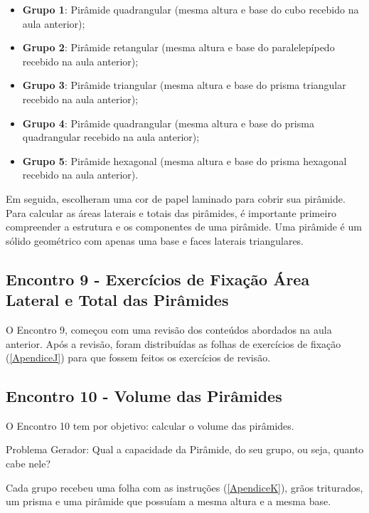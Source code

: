 \begin{itemize}
    \item \textbf{Grupo 1}: Pirâmide quadrangular (mesma altura e base do cubo recebido na aula anterior);
    \item \textbf{Grupo 2}: Pirâmide retangular (mesma altura e base do paralelepípedo recebido na aula anterior);
    \item \textbf{Grupo 3}: Pirâmide triangular (mesma altura e base do prisma triangular recebido na aula anterior);
    \item \textbf{Grupo 4}: Pirâmide quadrangular (mesma altura e base do prisma quadrangular recebido na aula anterior);
    \item \textbf{Grupo 5}: Pirâmide hexagonal (mesma altura e base do prisma hexagonal recebido na aula anterior).
\end{itemize}

Em seguida, escolheram uma cor de papel laminado para cobrir sua pirâmide. Para calcular as áreas laterais e totais das pirâmides, é importante primeiro compreender a estrutura e os componentes de uma pirâmide. Uma pirâmide é um sólido geométrico com apenas uma base e faces laterais triangulares.

\subsection{Encontro 9 - Exercícios de Fixação Área Lateral e Total das Pirâmides}

O Encontro 9, começou com uma revisão dos conteúdos abordados na aula anterior. Após a revisão, foram distribuídas as folhas de exercícios de fixação (\autoref{ApendiceJ}) para que fossem feitos os exercícios de revisão.

\subsection{Encontro 10 - Volume das Pirâmides}

O Encontro 10 tem por objetivo: calcular o volume das pirâmides.

Problema Gerador: Qual a capacidade da Pirâmide, do seu grupo, ou seja, quanto cabe nele?

Cada grupo recebeu uma folha com as instruções (\autoref{ApendiceK}), grãos triturados, um prisma e uma pirâmide que possuíam a mesma altura e a mesma base.

